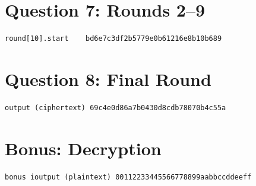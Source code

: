 \documentclass[11pt]{article}
\begin{document}
\section*{Question 7: Rounds 2--9}
\begin{verbatim}
round[10].start    bd6e7c3df2b5779e0b61216e8b10b689
\end{verbatim}

\section*{Question 8: Final Round}
\begin{verbatim}
output (ciphertext) 69c4e0d86a7b0430d8cdb78070b4c55a
\end{verbatim}

\section*{Bonus: Decryption}
\begin{verbatim}
bonus ioutput (plaintext) 00112233445566778899aabbccddeeff
\end{verbatim}
\end{document}
